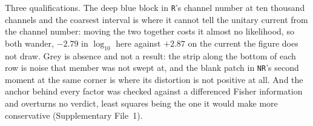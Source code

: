 Three qualifications. The deep blue block in \texttt{R}'s channel number at ten thousand channels
and the coarsest interval is where it cannot tell the unitary current from the channel number:
moving the two together costs it almost no likelihood, so both wander, $-2.79$ in $\log_{10}$ here
against $+2.87$ on the current the figure does not draw. Grey is absence and not a result: the strip
along the bottom of each row is noise that member was not swept at, and the blank patch in
\texttt{NR}'s second moment at the same corner is where its distortion is not positive at all. And
the anchor behind every factor was checked against a differenced Fisher information and overturns no
verdict, least squares being the one it would make more conservative (Supplementary File~1).

%
